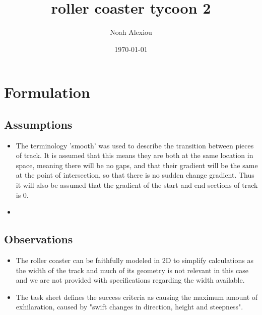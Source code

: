 \documentclass[11pt, letterpaper]{article}
\begin{document}
\begin{titlepage}
	\title{roller coaster tycoon 2}
	\author{Noah Alexiou}
	\date{\today}
	
	\maketitle
	\centering

	
\end{titlepage}


\newpage
\tableofcontents


\newpage


\section{Formulation}
\subsection{Assumptions}
\begin{itemize}
	\item The terminology 'smooth' was used to describe the transition between pieces of track. It is assumed that this means they are both at the same location in space, meaning there will be no gaps, and that their gradient will be the same at the point of intersection, so that there is no sudden change gradient. Thus it will also be assumed that the gradient of the start and end sections of track is 0.
	\item 
\end{itemize}




\subsection{Observations}
\begin{itemize}
	\item The roller coaster can be faithfully modeled in 2D to simplify calculations as the width of the track and much of its geometry is not relevant in this case and we are not provided with specifications regarding the width available. 
	\item The task sheet defines the success criteria as causing the maximum amount of exhilaration, caused by "swift changes in direction, height and steepness". 
\end{itemize}
\end{document}
